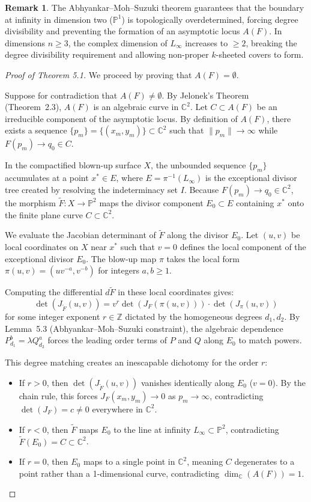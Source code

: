 \documentclass[11pt,reqno]{amsart}
\theoremstyle{definition}
\newtheorem{remark}[theorem]{Remark}
\begin{document}
\begin{remark}
    The Abhyankar–Moh–Suzuki theorem guarantees that the boundary at infinity in dimension two ($\mathbb{P}^1$) is topologically overdetermined, forcing degree divisibility and preventing the formation of an asymptotic locus $A(F)$. In dimensions $n \ge 3$, the complex dimension of $L_\infty$ increases to $\ge 2$, breaking the degree divisibility requirement and allowing non-proper $k$-sheeted covers to form.
\end{remark}

\begin{proof}[Proof of Theorem 5.1]
We proceed by proving that $A(F) = \emptyset$.

Suppose for contradiction that $A(F) \neq \emptyset$. By Jelonek's Theorem (Theorem~2.3), $A(F)$ is an algebraic curve in $\mathbb{C}^2$. Let $C \subset A(F)$ be an irreducible component of the asymptotic locus. By definition of $A(F)$, there exists a sequence $\{p_m\} = \{(x_m, y_m)\} \subset \mathbb{C}^2$ such that $\|p_m\| \to \infty$ while $F(p_m) \to q_0 \in C$.

In the compactified blown-up surface $X$, the unbounded sequence $\{p_m\}$ accumulates at a point $x^* \in E$, where $E = \pi^{-1}(L_\infty)$ is the exceptional divisor tree created by resolving the indeterminacy set $I$. Because $F(p_m) \to q_0 \in \mathbb{C}^2$, the morphism $\tilde{F}: X \to \mathbb{P}^2$ maps the divisor component $E_0 \subset E$ containing $x^*$ onto the finite plane curve $C \subset \mathbb{C}^2$.

We evaluate the Jacobian determinant of $\tilde{F}$ along the divisor $E_0$. Let $(u, v)$ be local coordinates on $X$ near $x^*$ such that $v = 0$ defines the local component of the exceptional divisor $E_0$. The blow-up map $\pi$ takes the local form $\pi(u,v) = (u v^{-a}, v^{-b})$ for integers $a, b \ge 1$.

Computing the differential $d\tilde{F}$ in these local coordinates gives:
$$\det(J_{\tilde{F}}(u,v)) = v^r \det(J_F(\pi(u,v))) \cdot \det(J_\pi(u,v))$$
for some integer exponent $r \in \mathbb{Z}$ dictated by the homogeneous degrees $d_1, d_2$. By Lemma~5.3 (Abhyankar--Moh--Suzuki constraint), the algebraic dependence $P_{d_1}^b = \lambda Q_{d_2}^a$ forces the leading order terms of $P$ and $Q$ along $E_0$ to match powers. 

This degree matching creates an inescapable dichotomy for the order $r$:
\begin{itemize}
    \item If $r > 0$, then $\det(J_{\tilde{F}}(u,v))$ vanishes identically along $E_0$ ($v = 0$). By the chain rule, this forces $J_F(x_m, y_m) \to 0$ as $p_m \to \infty$, contradicting $\det(J_F) = c \neq 0$ everywhere in $\mathbb{C}^2$.
    \item If $r < 0$, then $\tilde{F}$ maps $E_0$ to the line at infinity $L_\infty \subset \mathbb{P}^2$, contradicting $\tilde{F}(E_0) = C \subset \mathbb{C}^2$.
    \item If $r = 0$, then $E_0$ maps to a single point in $\mathbb{C}^2$, meaning $C$ degenerates to a point rather than a 1-dimensional curve, contradicting $\dim_{\mathbb{C}}(A(F)) = 1$.
\end{itemize}


\end{proof}
\end{document}
